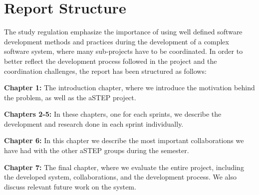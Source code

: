 \section{Report Structure} \label{sec:report_structure}
The study regulation emphasize the importance of using well defined software development methods and practices during the development of a complex software system, where many sub-projects have to be coordinated. In order to better reflect the development process followed in the project and the coordination challenges, the report has been structured as follows:

\textbf{Chapter 1:} The introduction chapter, where we introduce the motivation behind the problem, as well as the aSTEP project.

\textbf{Chapters 2-5:} In these chapters, one for each sprints, we describe the development and research done in each sprint individually.

\textbf{Chapter 6:} In this chapter we describe the most important collaborations we have had with the other aSTEP groups during the semester.

\lanote
\textbf{Chapter 7:} The final chapter, where we evaluate the entire project, including the developed system, collaborations, and the development process. We also discuss relevant future work on the system.